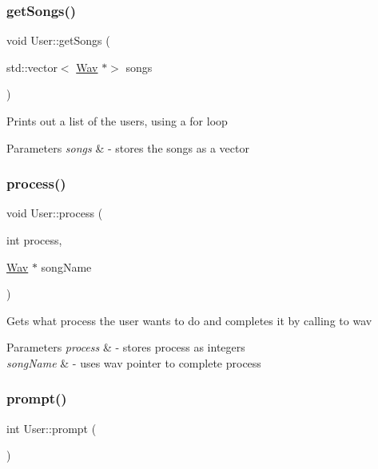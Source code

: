 \subsubsection{\texorpdfstring{get\+Songs()}{getSongs()}}
{\footnotesize\ttfamily void User\+::get\+Songs (\begin{DoxyParamCaption}\item[{std\+::vector$<$ \hyperlink{classWav}{Wav} $\ast$$>$}]{songs }\end{DoxyParamCaption})}

Prints out a list of the users, using a for loop 
\begin{DoxyParams}{Parameters}
{\em songs} & -\/ stores the songs as a vector \\
\hline
\end{DoxyParams}
\mbox{\label{classUser_a26fa7b4d62ab16626b37a25b24cf8310}} 
\subsubsection{\texorpdfstring{process()}{process()}}
{\footnotesize\ttfamily void User\+::process (\begin{DoxyParamCaption}\item[{int}]{process,  }\item[{\hyperlink{classWav}{Wav} $\ast$}]{song\+Name }\end{DoxyParamCaption})}

Gets what process the user wants to do and completes it by calling to wav 
\begin{DoxyParams}{Parameters}
{\em process} & -\/ stores process as integers \\
\hline
{\em song\+Name} & -\/ uses wav pointer to complete process \\
\hline
\end{DoxyParams}
\mbox{\label{classUser_a5e387ee476d9c8388de1c2750e05b64a}} 
\subsubsection{\texorpdfstring{prompt()}{prompt()}}
{\footnotesize\ttfamily int User\+::prompt (\begin{DoxyParamCaption}{ }\end{DoxyParamCaption})}

